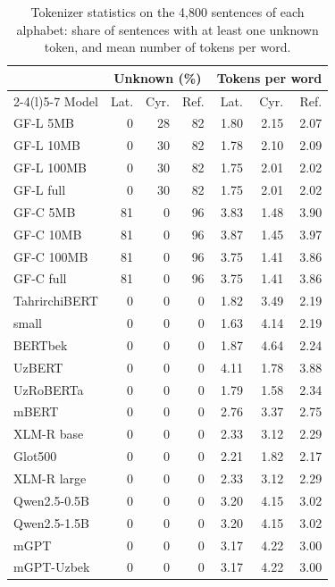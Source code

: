 \begin{table}[t]
\centering\small
\setlength{\tabcolsep}{3.5pt}
\begin{tabular}{@{}lrrrrrr@{}}
\toprule
 & \multicolumn{3}{c}{Unknown (\%)} & \multicolumn{3}{c}{Tokens per word} \\
\cmidrule(lr){2-4}\cmidrule(l){5-7}
Model & Lat. & Cyr. & Ref. & Lat. & Cyr. & Ref. \\
\midrule
GF-L 5MB & 0 & 28 & 82 & 1.80 & 2.15 & 2.07 \\
GF-L 10MB & 0 & 30 & 82 & 1.78 & 2.10 & 2.09 \\
GF-L 100MB & 0 & 30 & 82 & 1.75 & 2.01 & 2.02 \\
GF-L full & 0 & 30 & 82 & 1.75 & 2.01 & 2.02 \\
GF-C 5MB & 81 & 0 & 96 & 3.83 & 1.48 & 3.90 \\
GF-C 10MB & 81 & 0 & 96 & 3.87 & 1.45 & 3.97 \\
GF-C 100MB & 81 & 0 & 96 & 3.75 & 1.41 & 3.86 \\
GF-C full & 81 & 0 & 96 & 3.75 & 1.41 & 3.86 \\
TahrirchiBERT & 0 & 0 & 0 & 1.82 & 3.49 & 2.19 \\
\quad small & 0 & 0 & 0 & 1.63 & 4.14 & 2.19 \\
BERTbek & 0 & 0 & 0 & 1.87 & 4.64 & 2.24 \\
UzBERT & 0 & 0 & 0 & 4.11 & 1.78 & 3.88 \\
UzRoBERTa & 0 & 0 & 0 & 1.79 & 1.58 & 2.34 \\
mBERT & 0 & 0 & 0 & 2.76 & 3.37 & 2.75 \\
XLM-R base & 0 & 0 & 0 & 2.33 & 3.12 & 2.29 \\
Glot500 & 0 & 0 & 0 & 2.21 & 1.82 & 2.17 \\
XLM-R large & 0 & 0 & 0 & 2.33 & 3.12 & 2.29 \\
Qwen2.5-0.5B & 0 & 0 & 0 & 3.20 & 4.15 & 3.02 \\
Qwen2.5-1.5B & 0 & 0 & 0 & 3.20 & 4.15 & 3.02 \\
mGPT & 0 & 0 & 0 & 3.17 & 4.22 & 3.00 \\
mGPT-Uzbek & 0 & 0 & 0 & 3.17 & 4.22 & 3.00 \\
\bottomrule
\end{tabular}
\caption{Tokenizer statistics on the 4,800 sentences of each alphabet: share of sentences with at least one unknown token, and mean number of tokens per word.}
\label{tab:tokenizers}
\end{table}
